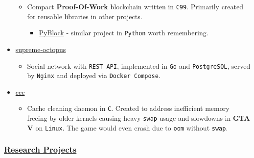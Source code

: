 \begin{itemize}
  \begin{itemize}
  \tightlist
  \item
    Compact
    \label{Ryabinkovux20Semyonux20Pavlovich-Petux20Projects-Proof-Of-Work}{}\textbf{Proof-Of-Work}
    blockchain written in \texttt{C99}. Primarily created for reusable
    libraries in other projects.

    \begin{itemize}
    \tightlist
    \item
      \href{https://github.com/ssleert/pyblock}{PyBlock} - similar
      project in \texttt{Python} worth remembering.
    \end{itemize}
  \end{itemize}
\item
  \href{https://github.com/zpx64/supreme-octopus}{supreme-octopus}

  \begin{itemize}
  \tightlist
  \item
    Social network with \texttt{REST\ API}, implemented in \texttt{Go}
    and \texttt{PostgreSQL}, served by \texttt{Nginx} and deployed via
    \texttt{Docker\ Compose}.
  \end{itemize}
\item
  \href{https://github.com/ssleert/ccc}{ccc}

  \begin{itemize}
  \tightlist
  \item
    Cache cleaning daemon in \texttt{C}. Created to address inefficient
    memory freeing by older kernels causing heavy \texttt{swap} usage
    and slowdowns in
    \label{Ryabinkovux20Semyonux20Pavlovich-Petux20Projects-GTAux20V}{}\textbf{GTA
    V} on \texttt{Linux}. The game would even crash due to \texttt{oom}
    without \texttt{swap}.
  \end{itemize}
\end{itemize}

\label{Ryabinkovux20Semyonux20Pavlovich-Researchux20Projects}
\subsubsection{\texorpdfstring{\hyperref[Ryabinkovux5cux2520Semyonux5cux2520Pavlovich-Researchux5cux2520Projects]{Research
Projects}}{Research Projects}}\label{Researchux20Projects}

